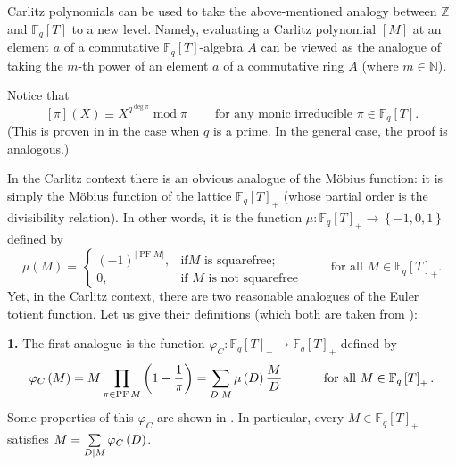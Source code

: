 \documentclass[numbers=enddot,12pt,final,onecolumn,notitlepage]{scrartcl}%
\theoremstyle{definition}
\let\sumnonlimits\sum
\let\prodnonlimits\prod
\renewcommand{\sum}{\sumnonlimits\limits}
\renewcommand{\prod}{\prodnonlimits\limits}
\begin{document}
Carlitz polynomials can be used to take the above-mentioned analogy between
$\mathbb{Z}$ and $\mathbb{F}_{q}\left[  T\right]  $ to a new level. Namely,
evaluating a Carlitz polynomial $\left[  M\right]  $ at an element $a$ of a
commutative $\mathbb{F}_{q}\left[  T\right]  $-algebra $A$ can be viewed as
the analogue of taking the $m$-th power of an element $a$ of a commutative
ring $A$ (where $m\in\mathbb{N}$).

Notice that%
\begin{equation}
\left[  \pi\right]  \left(  X\right)  \equiv X^{q^{\deg\pi}}\operatorname{mod}%
\pi\ \ \ \ \ \ \ \ \ \ \text{for any monic irreducible }\pi\in\mathbb{F}%
_{q}\left[  T\right]  . \label{carlitz-piX}%
\end{equation}
(This is proven in \cite[Theorem 2.11]{kc-carlitz} in the case when $q$ is a
prime. In the general case, the proof is analogous.)

In the Carlitz context there is an obvious analogue of the M\"{o}bius
function: it is simply the M\"{o}bius function of the lattice $\mathbb{F}%
_{q}\left[  T\right]  _{+}$ (whose partial order is the divisibility
relation). In other words, it is the function $\mu:\mathbb{F}_{q}\left[
T\right]  _{+}\rightarrow\left\{  -1,0,1\right\}  $ defined by%
\[
\mu\left(  M\right)  =%
\begin{cases}
\left(  -1\right)  ^{\left\vert \operatorname*{PF}M\right\vert }, & \text{if
}M\text{ is squarefree;}\\
0, & \text{if }M\text{ is not squarefree}%
\end{cases}
\ \ \ \ \ \ \ \ \ \ \text{for all }M\in\mathbb{F}_{q}\left[  T\right]  _{+}.
\]
Yet, in the Carlitz context, there are two reasonable analogues of the Euler
totient function. Let us give their definitions (which both are taken from
\cite{kc-carlitz}):

\textbf{1.} The first analogue is the function $\varphi_{C}:\mathbb{F}%
_{q}\left[  T\right]  _{+}\rightarrow\mathbb{F}_{q}\left[  T\right]  _{+}$
defined by%
\[
\varphi_{C}\left(  M\right)  =M\prod\limits_{\pi\in\operatorname*{PF}M}\left(
1-\dfrac{1}{\pi}\right)  =\sum\limits_{D\mid M}\mu\left(  D\right)  \dfrac
{M}{D}\ \ \ \ \ \ \ \ \ \ \text{for all }M\in\mathbb{F}_{q}\left[  T\right]
_{+}.
\]
Some properties of this $\varphi_{C}$ are shown in \cite[Theorem
4.5]{kc-carlitz}. In particular, every $M\in\mathbb{F}_{q}\left[  T\right]
_{+}$ satisfies $M=\sum\limits_{D\mid M}\varphi_{C}\left(  D\right)  $.
\end{document}
